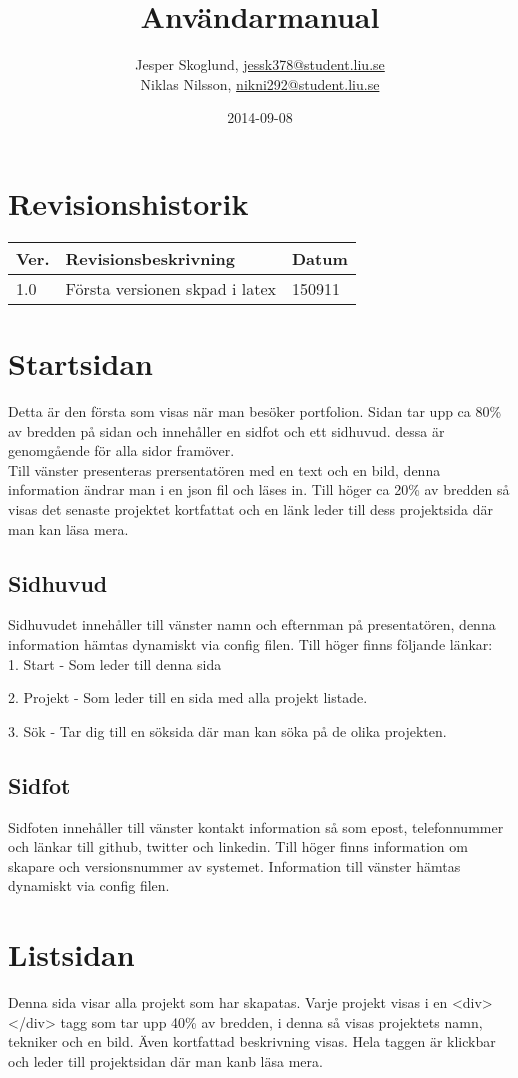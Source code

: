 \documentclass{TDP003mall}
\author{Jesper Skoglund, \url{jessk378@student.liu.se}\\
  Niklas Nilsson, \url{nikni292@student.liu.se}}
\title{Användarmanual}
\date{2014-09-08}
\begin{document}
\projectpage
\section{Revisionshistorik}
\begin{table}[!h]
\begin{tabularx}{\linewidth}{|l|X|l|}
\hline
Ver. & Revisionsbeskrivning & Datum \\\hline
1.0 & Första versionen skpad i latex & 150911 \\\hline
\end{tabularx}
\end{table}


\section{Startsidan}
Detta är den första som visas när man besöker portfolion. Sidan tar upp ca 80\% av bredden på sidan och innehåller en sidfot och ett sidhuvud. 
dessa är genomgående för alla sidor framöver. \\
Till vänster presenteras prersentatören med en text och en bild, denna information ändrar man i en json fil och läses in. Till höger ca 20\% av bredden 
så visas det senaste projektet kortfattat och en länk leder till dess projektsida där man kan läsa mera.  

\subsection{Sidhuvud}
Sidhuvudet innehåller till vänster namn och efternman på presentatören, denna information hämtas dynamiskt via config filen. Till höger finns följande länkar: \\

1. Start - Som leder till denna sida 

2. Projekt - Som leder till en sida med alla projekt listade.
 
3. Sök - Tar dig till en söksida där man kan söka på de olika projekten. 

\subsection{Sidfot}
Sidfoten innehåller till vänster kontakt information så som epost, telefonnummer och länkar till github, twitter och linkedin. Till höger finns information om skapare och versionsnummer av systemet. Information till vänster hämtas dynamiskt via config filen. 

\section{Listsidan}
Denna sida visar alla projekt som har skapatas. Varje projekt visas i en <div></div> tagg som tar upp 40\% av bredden, i denna så visas projektets 
namn, tekniker och en bild. Även kortfattad beskrivning visas. Hela taggen är klickbar och leder till projektsidan där man kanb läsa mera. 
\end{document}
